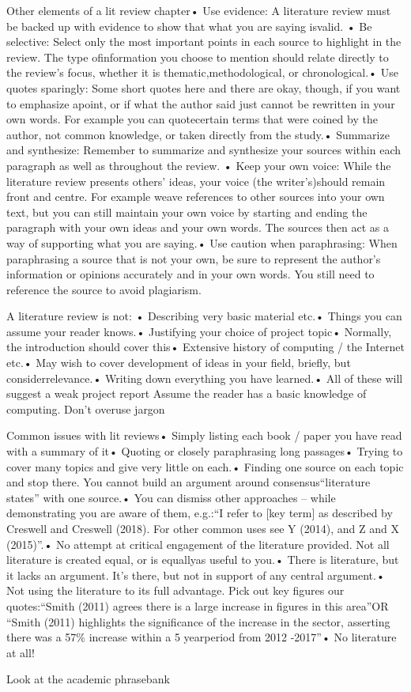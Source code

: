 {    Other elements of a lit review chapter• Use evidence: A literature review must be backed up with evidence to show that what you are saying isvalid.
    • Be selective: Select only the most important points in each source to highlight in the review. The type ofinformation you choose to mention should relate
    directly to the review’s focus, whether it is thematic,methodological, or chronological.• Use quotes sparingly: Some short quotes here and there are okay,
    though, if you want to emphasize apoint, or if what the author said just cannot be rewritten in your own words. For example you can quotecertain terms that were
    coined by the author, not common knowledge, or taken directly from the study.• Summarize and synthesize: Remember to summarize and synthesize your sources within
    each paragraph as well as throughout the review.
    • Keep your own voice: While the literature review presents others’ ideas, your voice (the writer’s)should remain front and centre.
    For example weave references to other sources into your own text, but you can still maintain your own voice by starting and ending the paragraph with your own ideas and
    your own words. The sources then act as a way of supporting what you are saying.• Use caution when paraphrasing: When paraphrasing a source that is not your own, be sure to
    represent the author’s information or opinions accurately and in your own words. You still need to reference the source to avoid plagiarism.

    A literature review is not:
    • Describing very basic material etc.• Things you can assume your reader knows.• Justifying your choice of project topic• Normally, the introduction should cover this• Extensive history of computing / the Internet etc.• May wish to cover development of ideas in your field, briefly, but considerrelevance.• Writing down everything you have learned.• All of these will suggest a weak project report
    Assume the reader has a basic knowledge of computing. Don't overuse jargon

    Common issues with lit reviews• Simply listing each book / paper you have read with a summary of it• Quoting or closely paraphrasing long passages• Trying to cover many topics and give very little on each.• Finding one source on each topic and stop there. You cannot build an argument around consensus“literature states” with one source.• You can dismiss other approaches – while demonstrating you are aware of them, e.g.:“I refer to [key term] as described by Creswell and Creswell (2018). For other common uses see Y (2014), and Z and X (2015)”.• No attempt at critical engagement of the literature provided. Not all literature is created equal, or is equallyas useful to you.• There is literature, but it lacks an argument. It’s there, but not in support of any central argument.• Not using the literature to its full advantage. Pick out key figures our quotes:“Smith (2011) agrees there is a large increase in figures in this area”OR “Smith (2011) highlights the significance of the increase in the sector, asserting there was a 57\% increase within a 5 yearperiod from 2012 -2017”• No literature at all!

    Look at the academic phrasebank
}

